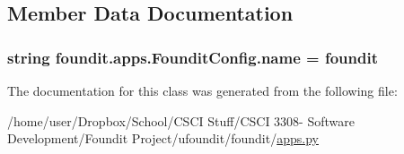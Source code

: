 \subsection{Member Data Documentation}
\subsubsection[{\texorpdfstring{name}{name}}]{\setlength{\rightskip}{0pt plus 5cm}string foundit.\+apps.\+Foundit\+Config.\+name = \textquotesingle{}foundit\textquotesingle{}\hspace{0.3cm}{\ttfamily [static]}}\hypertarget{classfoundit_1_1apps_1_1_foundit_config_a6acdf3587456db7401bd4701743c6b9d}{}\label{classfoundit_1_1apps_1_1_foundit_config_a6acdf3587456db7401bd4701743c6b9d}


The documentation for this class was generated from the following file\+:\begin{DoxyCompactItemize}
\item 
/home/user/\+Dropbox/\+School/\+C\+S\+C\+I Stuff/\+C\+S\+C\+I 3308-\/ Software Development/\+Foundit Project/ufoundit/foundit/\hyperlink{apps_8py}{apps.\+py}\end{DoxyCompactItemize}
